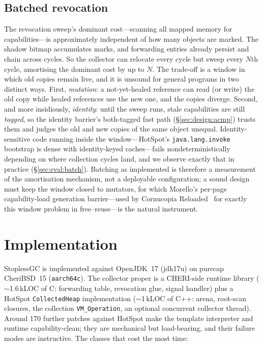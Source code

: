 \documentclass[acmsmall,nonacm,screen]{acmart}
\begin{document}
\subsection{Batched revocation}
\label{sec:design:batch}

The revocation sweep's dominant cost---scanning all mapped memory for
capabilities---is approximately independent of how many objects are
marked. The shadow bitmap accumulates marks, and forwarding entries
already persist and chain across cycles. So the collector can relocate
every cycle but sweep every $N$th cycle, amortising the dominant cost
by up to $N$. The trade-off is a window in which old copies remain live, and it is
unsound for general programs in two distinct ways. First,
\emph{mutation}: a not-yet-healed reference can read (or write) the
old copy while healed references use the new one, and the copies
diverge. Second, and more insidiously, \emph{identity}: until the
sweep runs, stale capabilities are still \emph{tagged}, so the
identity barrier's both-tagged fast path (\S\ref{sec:design:acmp})
trusts them and judges the old and new copies of the same object
unequal. Identity-sensitive code running inside the
window---HotSpot's \texttt{java.lang.invoke} bootstrap is dense with
identity-keyed caches---fails nondeterministically depending on where
collection cycles land, and we observe exactly that in practice
(\S\ref{sec:eval:batch}). Batching as implemented is therefore a
measurement of the amortisation mechanism, not a deployable
configuration; a sound design must keep the window closed to mutators,
for which Morello's per-page capability-load generation barrier---used
by Cornucopia Reloaded~\cite{cornucopia-reloaded} for exactly this
window problem in free--reuse---is the natural instrument.

\section{Implementation}
\label{sec:impl}

StoplessGC is implemented against OpenJDK~17 (jdk17u) on purecap
CheriBSD~15 (\texttt{aarch64c}). The collector proper is a CHERI-side
runtime library ($\sim$1.6\,kLOC of C: forwarding table, revocation
glue, signal handler) plus a HotSpot \texttt{CollectedHeap}
implementation ($\sim$1\,kLOC of C++: arena, root-scan closures, the
collection \texttt{VM\_Operation}, an optional concurrent collector
thread). Around 170 further patches against HotSpot make the template
interpreter and runtime capability-clean; they are mechanical but
load-bearing, and their failure modes are instructive. The classes that
cost the most time:
\end{document}
